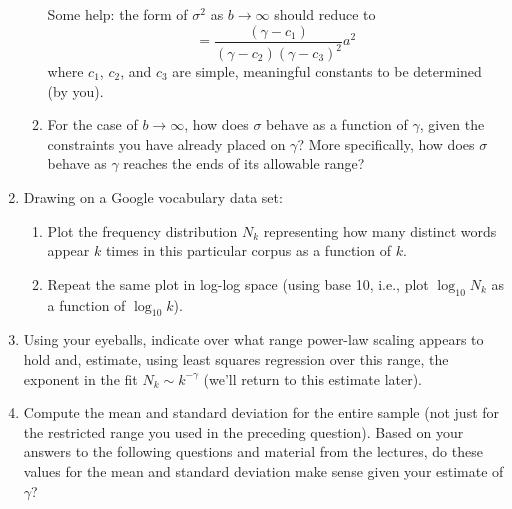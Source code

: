 \begin{enumerate}
\begin{enumerate}
    Some help: the form of $\sigma^2$ as $b \rightarrow \infty$
    should reduce to
    $$
    = 
    \frac{(\gamma-c_1)}
         {(\gamma-c_2)(\gamma-c_3)^2}
         a^{2}
         $$
         where $c_1$, $c_2$, and $c_3$ are
         simple, meaningful constants to be determined (by you).
       \item
         For the case of $b \rightarrow \infty$,
         how does $\sigma$ behave as a function of $\gamma$,
         given the constraints you have already placed on $\gamma$?
         More specifically, how does $\sigma$ behave as $\gamma$
         reaches the ends of its allowable range?
  \end{enumerate}

  
   \solutionstart


   \solutionend


\item
  Drawing on a Google vocabulary data set:
  \begin{enumerate}
  \item 
    Plot the frequency distribution $N_k$ representing 
    how many distinct words appear
    $k$ times in this particular corpus as
    a function of $k$.
  \item
    Repeat the same plot in log-log space (using base 10, i.e.,
    plot $\log_{10} N_k$ as a function of $\log_{10} k$).
  \end{enumerate}

  
   \solutionstart


   \solutionend


\item
  Using your eyeballs, indicate  over what range power-law scaling appears to hold
  and, 
  estimate, using least squares regression over this range, 
  the exponent in the fit
  $N_k \sim k^{-\gamma}$ (we'll return to this estimate later).


  
   \solutionstart


   \solutionend



\item
  Compute the mean and standard deviation for the entire sample
  (not just for the restricted range you used in the preceding question).
  Based on your answers to the following questions and material from the lectures,
  do these values for the mean and
  standard deviation make sense given your estimate of $\gamma$?


\end{enumerate}
